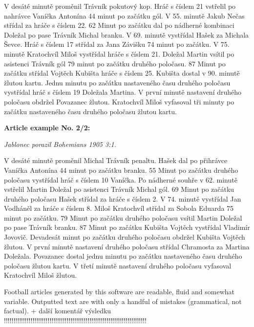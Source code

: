 V desáté minutě proměnil Trávník pokutový kop. Hráč s číslem 21 vstřelil po nahrávce Vaníčka Antonína 44 minut po začátku gól. V 55. minutě Jakub Nečas střídal za hráče s číslem 22. 62 Minut po začátku dal po nádherné kombinaci Doležal po pase Trávník Michal branku. V 69. minutě vystřídal Hašek za Michala Ševce. Hráč s číslem 17 střídal za Jana Závišku 74 minut po začátku. V 75. minutě Kratochvíl Miloš vystřídal hráče s číslem 21. Doležal Martin vsítil po asistenci Trávník gól 79 minut po začátku druhého poločasu. 87 Minut po začátku střídal Vojtěch Kubišta hráče s číslem 25. Kubišta dostal v 90. minutě žlutou kartu. Jednu minutu po začátku nastaveného času druhého poločasu vystřídal hráč s číslem 19 Doležala Martina. V první minutě nastavení druhého poločasu obdržel Povazanec žlutou. Kratochvíl Miloš vyfasoval tři minuty po začátku nastaveného času druhého poločasu žlutou kartu.

\noindent\makebox[\linewidth]{\rule{\textwidth}{0.4pt}}
\textbf{Article example No. 2/2:}
\begin{center}
\textit{Jablonec porazil Bohemians 1905 3:1.}
\end{center}                                      

V desáté minutě proměnil Michal Trávník penaltu. Hašek dal po přihrávce Vaníčka Antonína 44 minut po začátku branku. 55 Minut po začátku druhého poločasu vystřídal hráč s číslem 10 Vaníčka. Po nádherné souhře v 62. minutě vstřelil Martin Doležal po asistenci Trávník Michal gól. 69 Minut po začátku druhého poločasu Hašek střídal za hráče s číslem 2. V 74. minutě vystřídal Jan Vodháněl za hráče s číslem 8. Miloš Kratochvíl střídal za Sobola Eduarda 75 minut po začátku. 79 Minut po začátku druhého poločasu vsítil Martin Doležal po pase Trávník branku. 87 Minut po začátku Kubišta Vojtěch vystřídal Vladimír Jovovič. Devadesát minut po začátku druhého poločasu obdržel Kubišta Vojtěch žlutou. V první minutě nastavení druhého poločasu střídal Chramosta za Martina Doležala. Povazanec dostal jednu minutu po začátku nastaveného času druhého poločasu žlutou kartu. V třetí minutě nastavení druhého poločasu vyfasoval Kratochvíl Miloš žlutou.

\noindent\makebox[\linewidth]{\rule{\textwidth}{0.4pt}}

Football articles generated by this software are readable, fluid and somewhat variable. Outputted text are with only a handful of mistakes (grammatical, not factual).  + další komentář výsledku !!!!!!!!!!!!!!!!!!!!!!!!!!!!!!!!!!!!!!!!!!!!!!!!!!!!!!!!!!!!!!!!!!!!!!!!!!!


